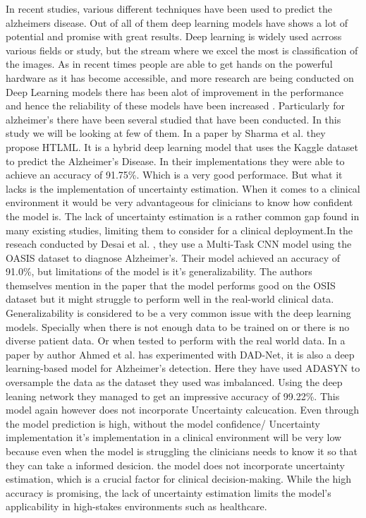 \documentclass[12pt,twocolumn]{report}
\begin{document}
In recent studies, various different techniques have been used to predict the alzheimers disease. Out of all of them deep learning models have shows a lot of potential and promise with great results. Deep learning is widely used acrross various fields or study, but the stream where we excel the most is classification of the images. As in recent times people are able to get hands on the powerful hardware as it has become accessible, and more research are being conducted on Deep Learning models there has been alot of improvement in the performance and hence the reliability of these models have been increased \cite{Yu2023}.
Particularly for alzheimer's there have been several studied that have been conducted. In this study we will be looking at few of them. In a paper by Sharma et al. \cite{2022Sarang} they propose HTLML. It is a hybrid deep learning model that uses the Kaggle dataset to predict the Alzheimer’s Disease. In their implementations they were able to achieve an accuracy of 91.75\%. Which is a very good performace. But what it lacks is the implementation of uncertainty estimation. When it comes to a clinical environment it would be very advantageous for clinicians to know how confident the model is. The lack of uncertainty estimation is a rather common gap found in many existing studies, limiting them to consider for a clinical deployment.In the reseach conducted by Desai et al. \cite{2024Desai}, they use a Multi-Task CNN model using the OASIS dataset to diagnose Alzheimer’s. Their model achieved an accuracy of 91.0\%, but limitations of the model is it's generalizability. The authors themselves mention in the paper that the model performs good on the OSIS dataset but it might struggle to perform well in the real-world clinical data. Generalizability is considered to be a very common issue with the deep learning models. Specially when there is not enough data to be trained on or there is no diverse patient data. Or when tested to perform with the real world data. In a paper by author Ahmed et al. \cite{2022Ahmed} has experimented with DAD-Net, it is also a deep learning-based model for Alzheimer’s detection. Here they have used ADASYN to oversample the data as the dataset they used was imbalanced. Using the deep leaning network they managed to get an impressive accuracy of 99.22\%. This model again however does not incorporate Uncertainty calcucation. Even through the model prediction is high, without the model confidence/ Uncertainty implementation it's implementation in a clinical environment will be very low because even when the model is struggling the clinicians needs to know it so that they can take a informed desicion. the model does not incorporate uncertainty estimation, which is a crucial factor for clinical decision-making. While the high accuracy is promising, the lack of uncertainty estimation limits the model's applicability in high-stakes environments such as healthcare.
\end{document}
